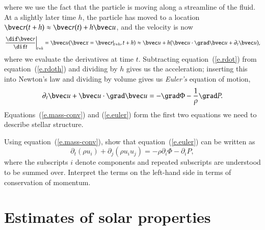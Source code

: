 where we use the fact that the particle is moving along a streamline of the fluid. At a slightly later time $h$, the particle has moved to a location $\vr(t + h) \approx \vr(t) + h\vu$, and the velocity is now
\begin{equation}\label{e.rdoth}
\left.\frac{\dif\vr}{\dif t}\right|_{t+h} = \vu(\vx = \vr|_{t+h},t+h)\approx \vu + h(\vu\cdot\grad\vu + \partial_{t}\vu),
\end{equation}
where we evaluate the derivatives at time $t$. Subtracting equation~(\ref{e.rdot}) from equation~(\ref{e.rdoth}) and dividing by $h$ gives us the acceleration; inserting this into Newton's law and dividing by volume gives us \emph{Euler's} equation of motion,
\begin{equation}\label{e.euler}
\partial_{t}\vu + \vu\cdot\grad\vu = -\grad \Phi - \frac{1}{\rho}\grad P.
\end{equation}
Equations~(\ref{e.mass-conv}) and (\ref{e.euler}) form the first two equations we need to describe stellar structure.

\begin{exercisebox}
Using equation~(\ref{e.mass-conv}), show that equation~(\ref{e.euler}) can be written as
\begin{equation}\label{e.momentum-conv}
\partial_{t}(\rho u_{i}) + \partial_{j}(\rho u_{i}u_{j}) = -\rho\partial_{i}\Phi - \partial_{i}P,
\end{equation}
where the subscripts $i$ denote components and repeated subscripts are understood to be summed over. Interpret the terms on the left-hand side in terms of conservation of momentum.
\end{exercisebox}


\section{Estimates of solar properties}

